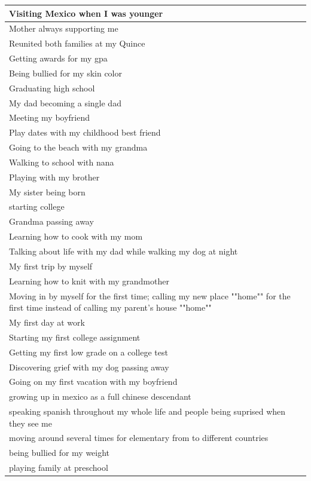 \documentclass[
  .7em,
  letterpaper,
  DIV=11,
  numbers=noendperiod]{scrartcl}
\begin{document}
\begin{table}
\begin{tabular}{l}
\hline
Visiting Mexico when I was younger\\
\hline
Mother always supporting me\\
\hline
Reunited both families at my Quince\\
\hline
Getting awards for my gpa\\
\hline
Being bullied for my skin color\\
\hline
Graduating high school\\
\hline
My dad becoming a single dad\\
\hline
Meeting my boyfriend\\
\hline
Play dates with my childhood best friend\\
\hline
Going to the beach with my grandma\\
\hline
Walking to school with nana\\
\hline
Playing with my brother\\
\hline
My sister being born\\
\hline
starting college\\
\hline
Grandma passing away\\
\hline
Learning how to cook with my mom\\
\hline
Talking about life with my dad while walking my dog at night\\
\hline
My first trip by myself\\
\hline
Learning how to knit with my grandmother\\
\hline
Moving in by myself for the first time; calling my new place ""home"" for the first time instead of calling my parent's house ""home""\\
\hline
My first day at work\\
\hline
Starting my first college assignment\\
\hline
Getting my first low grade on a college test\\
\hline
Discovering grief with my dog passing away\\
\hline
Going on my first vacation with my boyfriend\\
\hline
growing up in mexico as a full chinese descendant\\
\hline
speaking spanish throughout my whole life and people being suprised when they see me\\
\hline
moving around several times for elementary from to different countries\\
\hline
being bullied for my weight\\
\hline
playing family at preschool\\

\end{tabular}
\end{table}
\end{document}
